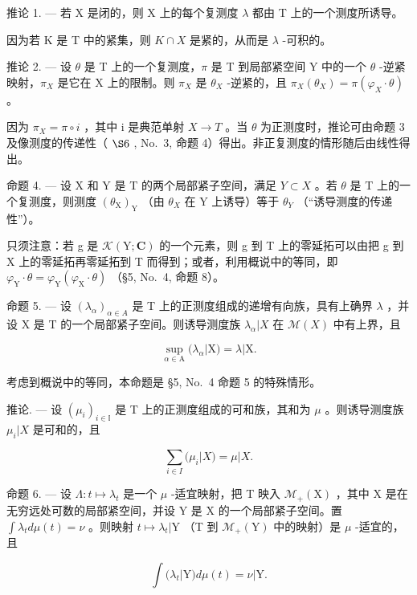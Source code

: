 推论 1. --- 若 X 是闭的，则 X 上的每个复测度 \(\lambda\) 都由 T 上的一个测度所诱导。

因为若 K 是 T 中的紧集，则 \(K \cap X\) 是紧的，从而是 \(\lambda\) -可积的。

推论 2. --- 设 \(\theta\) 是 T 上的一个复测度，\(\pi\) 是 T 到局部紧空间 Y 中的一个 \(\theta\) -逆紧映射，\(\pi_{X}\) 是它在 X 上的限制。则 \(\pi_{X}\) 是 \(\theta_{X}\) -逆紧的，且 \(\pi_{X}(\theta_{X}) = \pi(\varphi_{X} \cdot \theta)\) 。

因为 \(\pi_{X} = \pi \circ i\) ，其中 i 是典范单射 \(X \to T\) 。当 \(\theta\) 为正测度时，推论可由命题 3 及像测度的传递性（ \(\S6\) , No.~3, 命题 4）得出。非正复测度的情形随后由线性得出。

命题 4. --- 设 X 和 Y 是 T 的两个局部紧子空间，满足 \(Y \subset X\) 。若 \(\theta\) 是 T 上的一个复测度，则测度 \((\theta_{\mathrm{X}})_{\mathrm{Y}}\) （由 \(\theta_{X}\) 在 Y 上诱导）等于 \(\theta_{Y}\) （“诱导测度的传递性”）。

只须注意：若 g 是 \(\mathcal{K}(\mathrm{Y};\mathbf{C})\) 的一个元素，则 g 到 T 上的零延拓可以由把 g 到 X 上的零延拓再零延拓到 T 而得到；或者，利用概说中的等同，即 \(\varphi_{\mathrm{Y}}\cdot\theta=\varphi_{\mathrm{Y}}(\varphi_{\mathrm{X}}\cdot\theta)\) （§5, No.~4, 命题 8）。

命题 5. --- 设 \((\lambda_{\alpha})_{\alpha\in A}\) 是 T 上的正测度组成的递增有向族，具有上确界 \(\lambda\) ，并设 X 是 T 的一个局部紧子空间。则诱导测度族 \(\lambda_{\alpha}|X\) 在 \(\mathcal{M}(X)\) 中有上界，且

\[
\sup _ {\alpha \in \mathrm{A}} (\lambda_ {\alpha} | \mathrm{X}) = \lambda | \mathrm{X}.\tag{8}
\]

考虑到概说中的等同，本命题是 §5, No.~4 命题 5 的特殊情形。

推论. --- 设 \((\mu_{i})_{i\in\mathbb{I}}\) 是 T 上的正测度组成的可和族，其和为 \(\mu\) 。则诱导测度族 \(\mu_{i}|X\) 是可和的，且

\[
\sum_ {i \in I} (\mu_ {i} | X) = \mu | X.\tag{9}
\]

命题 6. --- 设 \(\Lambda: t \mapsto \lambda_t\) 是一个 \(\mu\) -适宜映射，把 T 映入 \(\mathcal{M}_+(\mathrm{X})\) ，其中 X 是在无穷远处可数的局部紧空间，并设 Y 是 X 的一个局部紧子空间。置 \(\int \lambda_t d\mu(t) = \nu\) 。则映射 \(t \mapsto \lambda_t|\mathrm{Y}\) （T 到 \(\mathcal{M}_+(\mathrm{Y})\) 中的映射）是 \(\mu\) -适宜的，且

\[
\int (\lambda_ {t} | \mathrm{Y}) d \mu (t) = \nu | \mathrm{Y}.\tag{10}
\]

